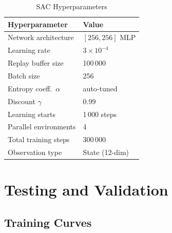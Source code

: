 \documentclass[conference]{IEEEtran}
\begin{document}
\begin{table}[h]
    \centering
    \caption{SAC Hyperparameters}
    \label{tab:hyperparams}
    \begin{tabular}{ll}
        \toprule
        Hyperparameter & Value \\
        \midrule
        Network architecture   & $[256, 256]$ MLP \\
        Learning rate          & $3 \times 10^{-4}$ \\
        Replay buffer size     & 100\,000 \\
        Batch size             & 256 \\
        Entropy coeff.\ $\alpha$ & auto-tuned \\
        Discount $\gamma$      & 0.99 \\
        Learning starts        & 1\,000 steps \\
        Parallel environments  & 4 \\
        Total training steps   & 300\,000 \\
        Observation type       & State (12-dim) \\
        \bottomrule
    \end{tabular}
\end{table}


\section{Testing and Validation}
\label{sec:testing}

\subsection{Training Curves}

\end{document}
